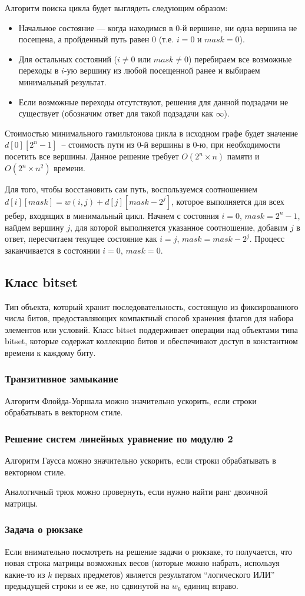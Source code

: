 Алгоритм поиска цикла будет выглядеть следующим образом:
\begin{itemize}
    \item Начальное состояние — когда находимся в $0$-й вершине, ни одна вершина не посещена, а пройденный путь равен 0 (т.е. $i=0$ и $mask=0$).
    \item Для остальных состояний ($i \ne 0$ или $mask \ne 0$) перебираем все возможные переходы в $i$-ую вершину из любой посещенной ранее и выбираем минимальный результат.
    \item Если возможные переходы отсутствуют, решения для данной подзадачи не существует (обозначим ответ для такой подзадачи как $\infty$).
\end{itemize}

Стоимостью минимального гамильтонова цикла в исходном графе будет значение $d[0][2^{n}-1]$~-- стоимость пути из $0$-й вершины в $0$-ю, при необходимости посетить все вершины. Данное решение требует $O(2^{n} \times n)$ памяти и $O(2^{n} \times n^{2})$ времени.

Для того, чтобы восстановить сам путь, воспользуемся соотношением $d[i][mask]=w(i,j)+d[j][mask-2^{j}]$, которое выполняется для всех ребер, входящих в минимальный цикл. Начнем с состояния $i=0$, $mask=2^{n}-1$, найдем вершину $j$, для которой выполняется указанное соотношение, добавим $j$ в ответ, пересчитаем текущее состояние как $i=j$, $mask=mask-2^{j}$. Процесс заканчивается в состоянии $i=0$, $mask=0$.

\subsection{Класс bitset}
Тип объекта, который хранит последовательность, состоящую из фиксированного числа битов, предоставляющих компактный способ хранения флагов для набора элементов или условий. Класс bitset поддерживает операции над объектами типа bitset, которые содержат коллекцию битов и обеспечивают доступ в константном времени к каждому биту.

\subsubsection{Транзитивное замыкание}
Алгоритм Флойда-Уоршала можно значительно ускорить, если строки обрабатывать в векторном стиле.

\subsubsection{Решение систем линейных уравнение по модулю 2}
Алгоритм Гаусса можно значительно ускорить, если строки обрабатывать в векторном стиле.

Аналогичный трюк можно провернуть, если нужно найти ранг двоичной матрицы.

\subsubsection{Задача о рюкзаке}
Если внимательно посмотреть на решение задачи о рюкзаке, то получается, что новая строка матрицы
возможных весов (которые можно набрать, используя какие-то из $k$ первых предметов) является
результатом ``логического ИЛИ'' предыдущей строки и ее же, но сдвинутой на $w_k$ единиц вправо.
